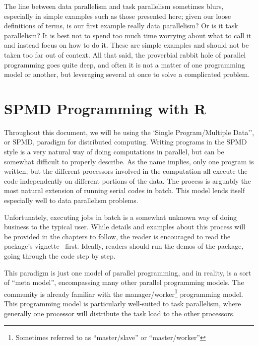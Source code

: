 The line between data parallelism and task parallelism sometimes blurs,
especially in simple examples such as those presented here; given our loose
definitions of terms, is our first example really data parallelism?  Or is
it task parallelism?  It is best not to spend too much time worrying about
what to call it and instead focus on how to do it. These are simple examples
and should not be taken too far out of context. All that said, the proverbial
rabbit hole of parallel programming goes quite deep, and often it is not a
matter of one programming model or another, but leveraging several at once
to solve a complicated problem.





\section{SPMD Programming with R}

Throughout this document, we will be using the `Single Program/Multiple Data'',
or SPMD, paradigm for distributed computing.
Writing programs in the SPMD style is a very natural way of doing
computations in parallel, but can be somewhat difficult to properly describe.
As the name implies, only one program is written, but the different processors
involved in the computation all execute the code independently on different
portions of the data. The process is arguably the most natural extension of
running serial codes in batch. This model lends itself especially well to
data parallelism problems.

Unfortunately, executing jobs in batch is a somewhat unknown way of doing
business to the typical  user. While details and examples about
this process will be provided in the chapters to follow, the reader is
encouraged to read the  package's
vignette~\citep{Chen2012pbdMPIvignette} first.  Ideally, readers should
run the demos of the  package, going through the code step by step.

This paradigm is just one model of parallel programming, and in reality, is a sort of ``meta model'', encompassing many other parallel programming models.  The  community is already familiar with the manager/worker\footnote{Sometimes referred to as ``master/slave'' or ``master/worker''} programming model.  This programming model is particularly well-suited to task parallelism, where generally one processor will distribute the task load to the other processors.

